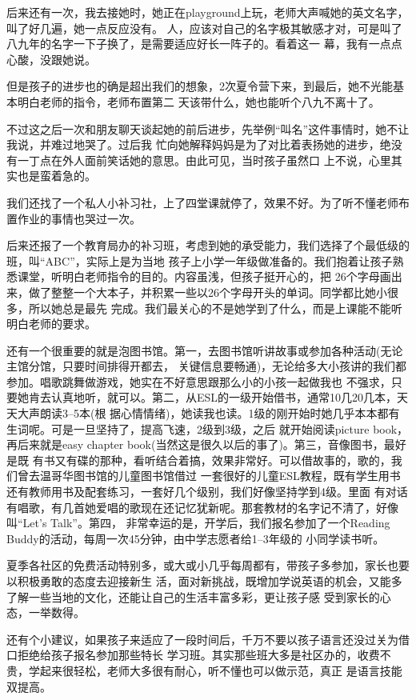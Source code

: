 \documentclass[11pt,a4paper,onecolumn]{article}
\begin{document}
后来还有一次，我去接她时，她正在playground上玩，老师大声喊她的英文名字，叫了好几遍，她一点反应没有。
人，应该对自己的名字极其敏感才对，可是叫了八九年的名字一下子换了，是需要适应好长一阵子的。看着这一
幕，我有一点点心酸，没跟她说。

但是孩子的进步也的确是超出我们的想象，2次夏令营下来，到最后，她不光能基本明白老师的指令，老师布置第二
天该带什么，她也能听个八九不离十了。

不过这之后一次和朋友聊天谈起她的前后进步，先举例``叫名''这件事情时，她不让我说，并难过地哭了。过后我
忙向她解释妈妈是为了对比着表扬她的进步，绝没有一丁点在外人面前笑话她的意思。由此可见，当时孩子虽然口
上不说，心里其实也是蛮着急的。

我们还找了一个私人小补习社，上了四堂课就停了，效果不好。为了听不懂老师布置作业的事情也哭过一次。

后来还报了一个教育局办的补习班，考虑到她的承受能力，我们选择了个最低级的班，叫``ABC''，实际上是为当地
孩子上小学一年级做准备的。我们抱着让孩子熟悉课堂，听明白老师指令的目的。内容虽浅，但孩子挺开心的，把
26个字母画出来，做了整整一个大本子，并积累一些以26个字母开头的单词。同学都比她小很多，所以她总是最先
完成。我们最关心的不是她学到了什么，而是上课能不能听明白老师的要求。

还有一个很重要的就是泡图书馆。第一，去图书馆听讲故事或参加各种活动(无论主馆分馆，只要时间排得开都去，
关键信息要畅通)，无论给多大小孩讲的我们都参加。唱歌跳舞做游戏，她实在不好意思跟那么小的小孩一起做我也
不强求，只要她肯去认真地听，就可以。第二，从ESL的一级开始借书，通常10几20几本，天天大声朗读3--5本(根
据心情情绪)，她读我也读。1级的刚开始时她几乎本本都有生词呢。可是一旦坚持了，提高飞速，2级到3级，之后
就开始阅读picture book，再后来就是easy chapter book(当然这是很久以后的事了)。第三，音像图书，最好是既
有书又有碟的那种，看听结合着搞，效果非常好。可以借故事的，歌的，我们曾去温哥华图书馆的儿童图书馆借过
一套很好的儿童ESL教程，既有学生用书还有教师用书及配套练习，一套好几个级别，我们好像坚持学到4级。里面
有对话有唱歌，有几首她爱唱的歌现在还记忆犹新呢。那套教材的名字记不清了，好像叫``Let's Talk''。第四，
非常幸运的是，开学后，我们报名参加了一个Reading Buddy的活动，每周一次45分钟，由中学志愿者给1--3年级的
小同学读书听。

夏季各社区的免费活动特别多，或大或小几乎每周都有，带孩子多参加，家长也要以积极勇敢的态度去迎接新生
活，面对新挑战，既增加学说英语的机会，又能多了解一些当地的文化，还能让自己的生活丰富多彩，更让孩子感
受到家长的心态，一举数得。

还有个小建议，如果孩子来适应了一段时间后，千万不要以孩子语言还没过关为借口拒绝给孩子报名参加那些特长
学习班。其实那些班大多是社区办的，收费不贵，学起来很轻松，老师大多很有耐心，听不懂也可以做示范，真正
是语言技能双提高。
\end{document}
